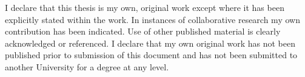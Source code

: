 \documentclass[11pt,a4paper]{report}      %
\begin{document}
\begin{thesisdeclaration}        %
I declare that this thesis is my own, original work except where it has been explicitly
stated within the work. In instances of collaborative research my own contribution
has been indicated. Use of other published material is clearly acknowledged or
referenced. I declare that my own original work has not been published prior to
submission of this document and has not been submitted to another University for
a degree at any level.


\end{thesisdeclaration}


\begin{thesisabstract}               %
\end{thesisabstract}
\end{document}
